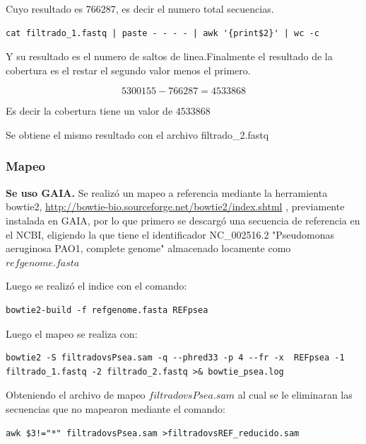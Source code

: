 \documentclass[journal, letterpaper, 11pt]{IEEEtran}
\begin{document}
Cuyo resultado es 766287, es decir el numero total secuencias.

\lstset{breaklines=true, basicstyle=\footnotesize}
\begin{lstlisting}[frame=single]
cat filtrado_1.fastq | paste - - - - | awk '{print$2}' | wc -c
\end{lstlisting}

Y su resultado es el numero de saltos de linea.\linebreak Finalmente el resultado de la cobertura es el restar el segundo valor menos el primero.

\[5300155 - 766287 = 4533868\]

Es decir la cobertura tiene un valor de $4533868$

Se obtiene el mismo resultado con el archivo filtrado\_2.fastq 
\linebreak
\subsubsection{Mapeo}
\textbf{Se uso GAIA.}
Se realizó un mapeo a referencia mediante la herramienta bowtie2, \url{http://bowtie-bio.sourceforge.net/bowtie2/index.shtml} , previamente instalada en GAIA, por lo que primero se descargó una secuencia de referencia en el NCBI, eligiendo la que tiene el identificador NC\_002516.2 "Pseudomonas aeruginosa PAO1, complete genome" almacenado locamente como $refgenome.fasta$ 

Luego se realizó el indice con el comando:

\lstset{breaklines=true, basicstyle=\footnotesize}
\begin{lstlisting}[frame=single]
bowtie2-build -f refgenome.fasta REFpsea
\end{lstlisting}

Luego el mapeo se realiza con:

\lstset{breaklines=true, basicstyle=\footnotesize}
\begin{lstlisting}[frame=single]
bowtie2 -S filtradovsPsea.sam -q --phred33 -p 4 --fr -x  REFpsea -1 filtrado_1.fastq -2 filtrado_2.fastq >& bowtie_psea.log
\end{lstlisting}

Obteniendo el archivo de mapeo $filtradovsPsea.sam$ al cual se le eliminaran las secuencias que no mapearon mediante el comando:

\lstset{breaklines=true, basicstyle=\footnotesize}
\begin{lstlisting}[frame=single]
awk $3!="*" filtradovsPsea.sam >filtradovsREF_reducido.sam
\end{lstlisting}
\end{document}
